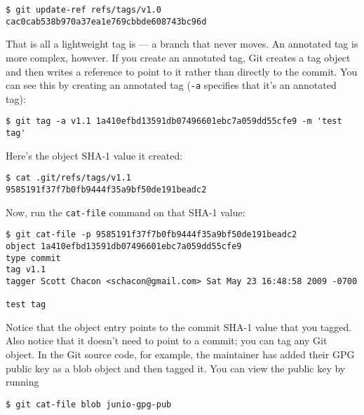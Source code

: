 \documentclass[a4paper]{book}
\begin{document}
\begin{shaded}\begin{verbatim}
$ git update-ref refs/tags/v1.0 cac0cab538b970a37ea1e769cbbde608743bc96d
\end{verbatim}\end{shaded}

That is all a lightweight tag is --- a branch that never moves. An annotated tag is more complex, however. If you create an annotated tag, Git creates a tag object and then writes a reference to point to it rather than directly to the commit. You can see this by creating an annotated tag (\texttt{-a} specifies that it's an annotated tag):

\begin{shaded}\begin{verbatim}
$ git tag -a v1.1 1a410efbd13591db07496601ebc7a059dd55cfe9 -m 'test tag'
\end{verbatim}\end{shaded}

Here's the object SHA-1 value it created:

\begin{shaded}\begin{verbatim}
$ cat .git/refs/tags/v1.1
9585191f37f7b0fb9444f35a9bf50de191beadc2
\end{verbatim}\end{shaded}

Now, run the \texttt{cat-file} command on that SHA-1 value:

\begin{shaded}\begin{verbatim}
$ git cat-file -p 9585191f37f7b0fb9444f35a9bf50de191beadc2
object 1a410efbd13591db07496601ebc7a059dd55cfe9
type commit
tag v1.1
tagger Scott Chacon <schacon@gmail.com> Sat May 23 16:48:58 2009 -0700

test tag
\end{verbatim}\end{shaded}

Notice that the object entry points to the commit SHA-1 value that you tagged. Also notice that it doesn't need to point to a commit; you can tag any Git object. In the Git source code, for example, the maintainer has added their GPG public key as a blob object and then tagged it. You can view the public key by running

\begin{shaded}\begin{verbatim}
$ git cat-file blob junio-gpg-pub
\end{verbatim}\end{shaded}
\end{document}
